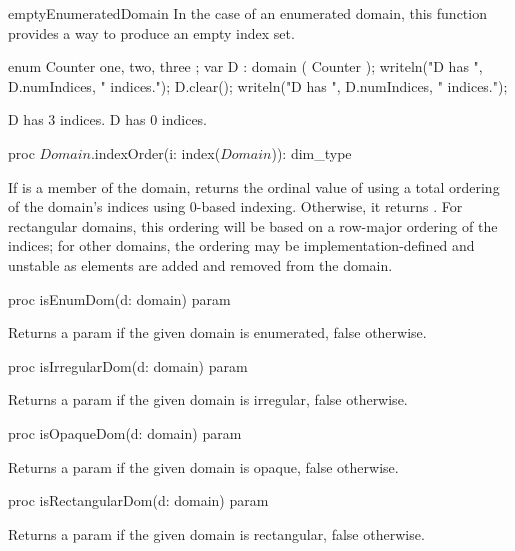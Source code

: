 \begin{chapelexample}{emptyEnumeratedDomain}
In the case of an enumerated domain, this function provides a way to produce an
empty index set.
\begin{chapel}
enum Counter { one, two, three };
var D : domain ( Counter );
writeln("D has ", D.numIndices, " indices.");
D.clear();
writeln("D has ", D.numIndices, " indices.");
\end{chapel}
\begin{chapeloutput}
D has 3 indices.
D has 0 indices.
\end{chapeloutput}
\end{chapelexample}

\begin{protohead}
proc $Domain$.indexOrder(i: index($Domain$)): dim_type
\end{protohead}
\begin{protobody}
If  is a member of the domain, returns the ordinal value of
 using a total ordering of the domain's indices using 0-based
indexing.  Otherwise, it returns .  For rectangular
domains, this ordering will be based on a row-major ordering of the
indices; for other domains, the ordering may be
implementation-defined and unstable as elements are added and
removed from the domain.
\end{protobody}

\begin{protohead}
proc isEnumDom(d: domain) param
\end{protohead}
\begin{protobody}
Returns a param  if the given domain is enumerated, false otherwise.
\end{protobody}

\begin{protohead}
proc isIrregularDom(d: domain) param
\end{protohead}
\begin{protobody}
Returns a param  if the given domain is irregular, false otherwise.
\end{protobody}

\begin{protohead}
proc isOpaqueDom(d: domain) param
\end{protohead}
\begin{protobody}
Returns a param  if the given domain is opaque, false otherwise.
\end{protobody}

\begin{protohead}
proc isRectangularDom(d: domain) param
\end{protohead}
\begin{protobody}
Returns a param  if the given domain is rectangular, false otherwise.
\end{protobody}

